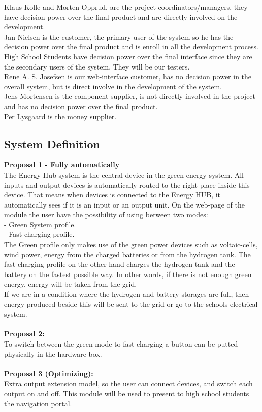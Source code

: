 Klaus Kolle and Morten Opprud, are the project coordinators/managers, they
have decision power over the final product and are directly involved on the
development.\\
\newline
Jan Nielsen is the customer, the primary user of the system so he has the
decision power over the final product and is enroll in all the development
process.\\
\newline
High School Students have decision power over the final interface since they
are the secondary users of the system. They will be our testers.\\
\newline
Rene A. S. Josefsen is our web-interface customer, has no decision power in the
overall system, but is direct involve in the development of the system.\\
\newline
Jens Mortensen is the component supplier, is not directly involved in the
project and has no decision power over the final product.\\
\newline
Per Lysgaard is the money supplier.\\
\newline

\subsection{System Definition}
\textbf{Proposal 1 - Fully automatically}\\
The Energy-Hub system is the central device in the green-energy system. All
inputs and output devices is automatically routed to the right place inside this
device. That means when devices is connected to the Energy HUB, it automatically
sees if it is an input or an output unit. On the web-page of the module the user
have the possibility of using between two modes:
\\ - Green System profile.
\\ - Fast charging profile.
\\The Green profile only makes use of the green power devices such as
voltaic-cells, wind power, energy from the charged batteries or from the
hydrogen tank. 
The fast charging profile on the other hand charges the hydrogen tank and the
battery on the fastest possible way. In other words, if there is not enough
green energy, energy will be taken from the grid.
\\If we are in a condition where the hydrogen and battery storages are full,
then energy produced beside this will be sent to the grid or go to the schools
electrical system.\\\\
\textbf{Proposal 2:}\\
To switch between the green mode to fast charging a button can be putted
physically in the hardware box.\\\\
\textbf{Proposal 3 (Optimizing):}\\
Extra output extension model, so the user can connect devices, and switch
each output on and off. This module will be used to present to high school
students the navigation portal.